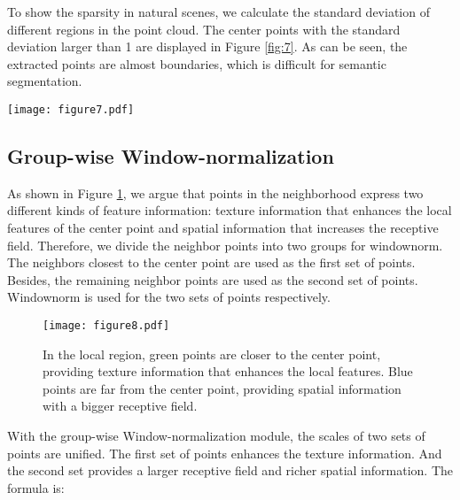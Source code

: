 \documentclass[10pt,twocolumn,letterpaper]{article}
\begin{document}
        To show the sparsity in natural scenes, we calculate the standard deviation of different regions in the point cloud.
        The center points with the standard deviation larger than 1 are displayed in Figure \ref{fig:7}.
        As can be seen, the extracted points are almost boundaries, which is difficult for semantic segmentation.
        \begin{figure*}[!htb]
        \centering
        \texttt{[image: figure7.pdf]}
        \caption{The standard deviation of different regions in the point cloud. The center points with the standard deviation of neighbors larger than 1 are displayed. (a) A point cloud with coordinates and RGB features of a scene in S3DIS (Area 5). (b) Points with the standard deviation of neighbors larger than 1.}
        \label{fig:7}
        \end{figure*}

    \subsection{Group-wise Window-normalization}

        As shown in Figure \ref{fig:8}, we argue that points in the neighborhood express two different kinds of feature information: texture information that enhances the local features of the center point and spatial information that increases the receptive field. Therefore, we divide the neighbor points into two groups for windownorm. The  neighbors closest to the center point are used as the first set of points. Besides, the remaining neighbor points are used as the second set of points. Windownorm is used for the two sets of points respectively.
        \begin{figure}[!htb]
        \centering
        \texttt{[image: figure8.pdf]}
        \caption{In the local region, green points are closer to the center point, providing texture information that enhances the local features. Blue points are far from the center point, providing spatial information with a bigger receptive field.}
        \label{fig:8}
        \end{figure}

        With the group-wise Window-normalization module, the scales of two sets of points are unified.
        The first set of points enhances the texture information.
        And the second set provides a larger receptive field and richer spatial information.
        The formula is:
\end{document}
